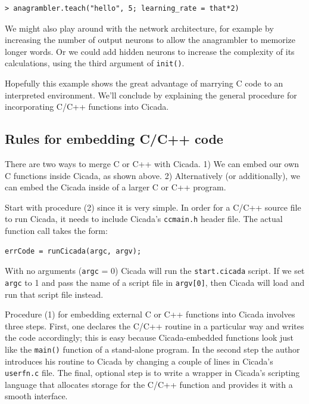 \documentclass{article}
\newenvironment{code}{
       \begin{list}{}{
               \setlength{\leftmargin}{.4in}
               \setlength{\rightmargin}{0in}
               \setlength{\topsep}{.2in}
       }
       \small
       \item[] }
       { \end{list}   }
\begin{document}
\begin{code} \begin{verbatim}
> anagrambler.teach("hello", 5; learning_rate = that*2)
\end{verbatim} \end{code}

\noindent We might also play around with the network architecture, for example by increasing the number of output neurons to allow the anagrambler to memorize longer words.  Or we could add hidden neurons to increase the complexity of its calculations, using the third argument of \verb#init()#.

Hopefully this example shows the great advantage of marrying C code to an interpreted environment.  We'll conclude by explaining the general procedure for incorporating C/C++ functions into Cicada.




\subsection{Rules for embedding C/C++ code}

There are two ways to merge C or C++ with Cicada.  1) We can embed our own C functions inside Cicada, as shown above.  2) Alternatively (or additionally), we can embed the Cicada inside of a larger C or C++ program.

Start with procedure (2) since it is very simple.  In order for a C/C++ source file to run Cicada, it needs to include Cicada's \verb#ccmain.h# header file.  The actual function call takes the form:

\begin{code} \begin{verbatim}
errCode = runCicada(argc, argv);
\end{verbatim} \end{code}

\noindent With no arguments (\verb#argc# = 0) Cicada will run the \verb#start.cicada# script.  If we set \verb#argc# to 1 and pass the name of a script file in \verb#argv[0]#, then Cicada will load and run that script file instead.

Procedure (1) for embedding external C or C++ functions into Cicada involves three steps.  First, one declares the C/C++ routine in a particular way and writes the code accordingly; this is easy because Cicada-embedded functions look just like the \verb#main()# function of a stand-alone program.  In the second step the author introduces his routine to Cicada by changing a couple of lines in Cicada's \verb#userfn.c# file.  The final, optional step is to write a wrapper in Cicada's scripting language that allocates storage for the C/C++ function and provides it with a smooth interface.
\end{document}
